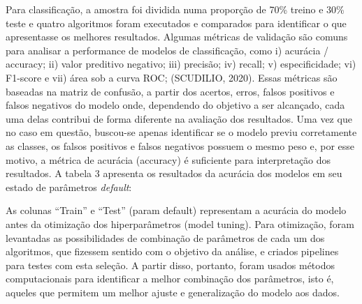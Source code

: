 \documentclass[twocolumn]{rbef}
\newcommand{\1}{\mathbbm{1}}
\begin{document}
\newline\linebreak Para classificação, a amostra foi dividida numa proporção de 70\% treino e 30\% teste e quatro algoritmos foram executados e comparados para identificar o que apresentasse os melhores resultados.
Algumas métricas de validação são comuns para analisar a performance de modelos de classificação, como i) acurácia / accuracy; ii) valor preditivo negativo; iii) precisão; iv) recall; v) especificidade; vi) F1-score e vii) área sob a curva ROC; (SCUDILIO, 2020)\cite{SCUDILIO}. Essas métricas são baseadas na matriz de confusão, a partir dos acertos, erros, falsos positivos e falsos negativos do modelo onde, dependendo do objetivo a ser alcançado, cada uma delas contribui de forma diferente na avaliação dos resultados. Uma vez que no caso em questão, buscou-se apenas identificar se o modelo previu corretamente as classes, os falsos positivos e falsos negativos possuem o mesmo peso e, por esse motivo, a métrica de acurácia (accuracy) é suficiente para interpretação dos resultados. A tabela 3 apresenta os resultados da acurácia dos modelos em seu estado de parâmetros \emph{default}:
\begin{table}[!htb]
\caption{Classificadores: parâmetros default}
\end{table}
\newline\linebreak As colunas “Train” e “Test” (param default) representam a acurácia do modelo antes da otimização dos hiperparâmetros (model tuning). Para otimização, foram levantadas as possibilidades de combinação de parâmetros de cada um dos algoritmos, que fizessem sentido com o objetivo da análise, e criados pipelines para testes com esta seleção. A partir disso, portanto, foram usados métodos computacionais para identificar a melhor combinação dos parâmetros, isto é, aqueles que permitem um melhor ajuste e generalização do modelo aos dados.
\end{document}
